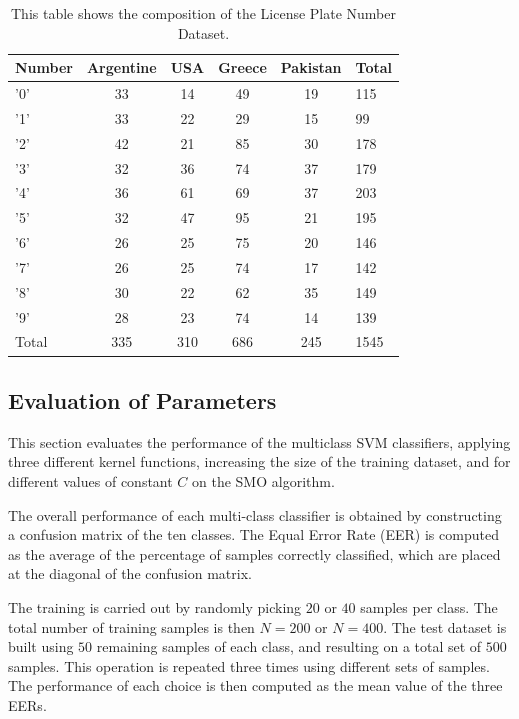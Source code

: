 \documentclass{ipol}
\begin{document}
\begin{table}[!htbp]
\small
\begin{center}
\begin{tabular}{l c c c c | l}
\hline
Number & Argentine & USA & Greece & Pakistan & Total\\
\hline
'0' & 33 & 14 & 49 & 19 & 115 \\
'1' & 33 & 22 &  29 & 15 & 99\\
'2' & 42 & 21 & 85 & 30 & 178\\
'3' & 32 & 36 & 74 & 37 & 179\\
'4' & 36 & 61 &  69 & 37 & 203\\
'5' & 32 & 47 &  95 & 21 & 195\\
'6' & 26 & 25 & 75 & 20 & 146\\
'7' & 26 & 25 & 74 & 17 & 142\\
'8' & 30 & 22 & 62 & 35 & 149\\
'9' & 28 & 23 & 74 & 14 & 139\\
\hline
Total & 335 & 310 & 686 & 245 & 1545\\
\hline
\end{tabular}
\caption{This table shows the composition of the License Plate Number Dataset.}
\label{tab:dataset}
\end{center}
\end{table}

\subsection{Evaluation of Parameters} \label{sec:evalparams}

This section evaluates the performance of the multiclass SVM classifiers, applying three different kernel functions, increasing the size of the training dataset, and for different values of constant $C$ on the SMO algorithm.

The overall performance of each multi-class classifier is obtained by constructing a confusion matrix of the ten classes.
The Equal Error Rate (EER) is computed as the average of the percentage of samples correctly classified, which are placed at the diagonal of the confusion matrix.

The training is carried out by randomly picking $20$ or $40$ samples per class.
The total number of training samples is then $N=200$ or $N=400$.
The test dataset is built using $50$ remaining samples of each class, and resulting on a total set of $500$ samples.
This operation is repeated three times using different sets of samples.
The performance of each choice is then computed as the mean value of the three EERs.
\end{document}
